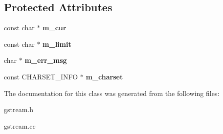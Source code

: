 \subsection*{Protected Attributes}
\begin{DoxyCompactItemize}
\item 
\mbox{\label{classGis__read__stream_a1e1aed4d688709c5ee84528fe06a4f01}} 
const char $\ast$ {\bfseries m\+\_\+cur}
\item 
\mbox{\label{classGis__read__stream_a43852791d2bdc7098b7073c040cf4a8a}} 
const char $\ast$ {\bfseries m\+\_\+limit}
\item 
\mbox{\label{classGis__read__stream_a44b44b04d89da6cc6d3949038e2fde3f}} 
char $\ast$ {\bfseries m\+\_\+err\+\_\+msg}
\item 
\mbox{\label{classGis__read__stream_aa9176db3c761a9bcfc2afdce3cd5dce1}} 
const C\+H\+A\+R\+S\+E\+T\+\_\+\+I\+N\+FO $\ast$ {\bfseries m\+\_\+charset}
\end{DoxyCompactItemize}


The documentation for this class was generated from the following files\+:\begin{DoxyCompactItemize}
\item 
gstream.\+h\item 
gstream.\+cc\end{DoxyCompactItemize}
